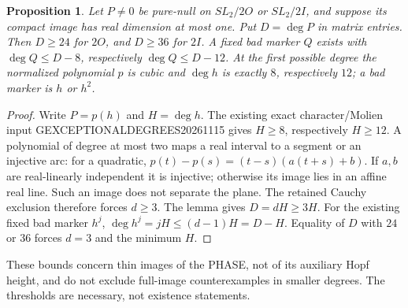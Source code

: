 \documentclass[11pt]{article}
\newtheorem{proposition}{Proposition}
\begin{document}
\begin{proposition}
Let $P\ne0$ be pure-null on $SL_2/2O$ or $SL_2/2I$, and suppose its compact
image has real dimension at most one. Put $D=\deg P$ in matrix entries.
Then $D\ge24$ for $2O$, and $D\ge36$ for $2I$. A fixed bad marker $Q$ exists
with $\deg Q\le D-8$, respectively $\deg Q\le D-12$.
At the first possible degree the normalized polynomial $p$ is cubic and
$\deg h$ is exactly $8$, respectively $12$; a bad marker is $h$ or $h^2$.
\end{proposition}
\begin{proof}
Write $P=p(h)$ and $H=\deg h$. The existing exact character/Molien input
GEXCEPTIONALDEGREES20261115 gives $H\ge8$, respectively $H\ge12$.
A polynomial of degree at most two maps a real interval to a segment or
an injective arc: for a quadratic,
$p(t)-p(s)=(t-s)(a(t+s)+b)$. If $a,b$ are real-linearly independent it is
injective; otherwise its image lies in an affine real line. Such an image
does not separate the plane. The retained Cauchy exclusion therefore
forces $d\ge3$. The lemma gives $D=dH\ge3H$. For the existing fixed bad
marker $h^j$, $\deg h^j=jH\le(d-1)H=D-H$. Equality of $D$ with $24$ or $36$
forces $d=3$ and the minimum $H$.
\end{proof}
These bounds concern thin images of the PHASE, not of its auxiliary Hopf
height, and do not exclude full-image counterexamples in smaller degrees.
The thresholds are necessary, not existence statements.
\end{document}
